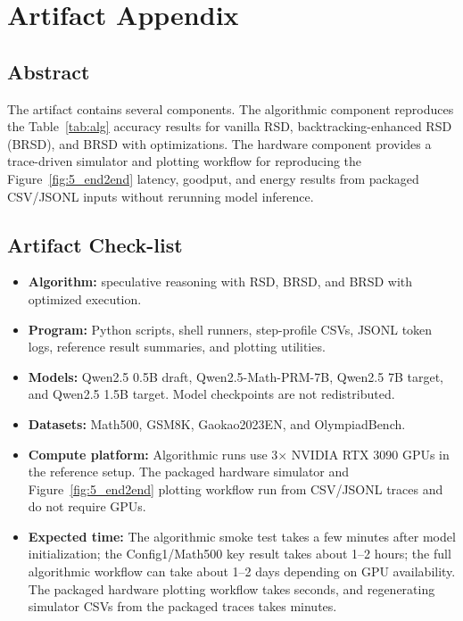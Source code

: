 \section{Artifact Appendix}
\label{app:artifact_alghard}

\subsection{Abstract}
The artifact contains several components. The algorithmic
component reproduces the Table~\ref{tab:alg} accuracy results for vanilla RSD,
backtracking-enhanced RSD (BRSD), and BRSD with optimizations. The hardware
component provides a trace-driven simulator and plotting workflow for
reproducing the Figure~\ref{fig:5_end2end} latency, goodput, and energy results from packaged
CSV/JSONL inputs without rerunning model inference.

\subsection{Artifact Check-list}
\begin{itemize}[leftmargin=*, itemsep=1pt]
  \item \textbf{Algorithm:} speculative reasoning with RSD, BRSD, and BRSD with optimized execution.
  \item \textbf{Program:} Python scripts, shell runners, step-profile CSVs, JSONL token logs, reference result summaries, and plotting utilities.
  \item \textbf{Models:} Qwen2.5 0.5B draft, Qwen2.5-Math-PRM-7B, Qwen2.5 7B target, and Qwen2.5 1.5B target. Model checkpoints are not redistributed.
  \item \textbf{Datasets:} Math500, GSM8K, Gaokao2023EN, and OlympiadBench.
  \item \textbf{Compute platform:} Algorithmic runs use 3$\times$ NVIDIA RTX 3090 GPUs in the reference setup. The packaged hardware simulator and Figure~\ref{fig:5_end2end} plotting workflow run from CSV/JSONL traces and do not require GPUs.
  \item \textbf{Expected time:} The algorithmic smoke test takes a few minutes after model initialization; the Config1/Math500 key result takes about 1--2 hours; the full algorithmic workflow can take about 1--2 days depending on GPU availability. The packaged hardware plotting workflow takes seconds, and regenerating simulator CSVs from the packaged traces takes minutes.
  
\end{itemize}

